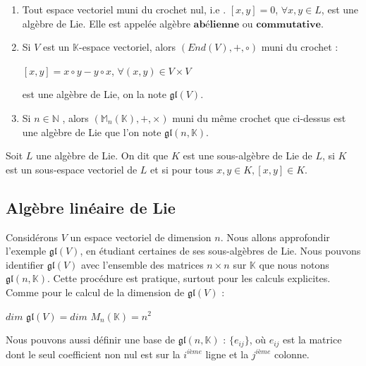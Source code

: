 \documentclass[a4paper,openany,12pt]{report}
\newcommand{\KK}{\mathbb{K}}
\newcommand{\NN}{\mathbb{N}}
\newcommand{\MM}{\mathbb{M}}
\newcommand{\gl}{\mathfrak{gl}}
\theoremstyle{break}
{\theorembodyfont{\upshape}
\newtheorem*{rmq}{Remarque :}
\newtheorem*{prv}{Preuve :}
\newtheorem*{ex}{Exemples :}
\newtheorem{exe}{Exemple : }
\newtheorem*{nota}{Notation :}}
\begin{document}
\begin{ex}
\begin{enumerate}
\item Tout espace vectoriel muni du crochet nul, i.e . $[x,y]=0$, $\forall x,y \in L $, est une algèbre de Lie. Elle est appelée algèbre $\textbf{abélienne} $ ou $\textbf{commutative}$.

\item Si $V$ est un $\KK$-espace vectoriel,  alors $(End(V),+,\circ)$ muni du crochet : 
\begin{center}
$[x,y]=x \circ y-y \circ x$, $\forall (x,y) \in V \times V$
\end{center}
est une algèbre de Lie, on la note $\gl(V)$.

\item Si $ n \in \NN $ , alors $(\MM_{n}(\KK),+,\times)$ muni du même crochet que ci-dessus est une algèbre de Lie que l'on note $\gl(n,\KK)$.
\end{enumerate}
\end{ex}

\begin{df} 
\quad Soit $L$ une algèbre de Lie. On dit que $K$ est une sous-algèbre de Lie de $L$, si $K$ est un sous-espace vectoriel de $L$ et si pour tous $x , y \in K , [x,y] \in K$.
\end{df}

\subsection{Algèbre linéaire de Lie}

\quad Considérons $V$ un espace vectoriel de dimension $n$. Nous allons approfondir l'exemple $\gl(V)$, en étudiant certaines de ses sous-algèbres de Lie. Nous pouvons identifier $\gl(V)$  avec l'ensemble des matrices $n \times n$ sur $\KK$ que nous notons $\gl(n,\KK)$. Cette procédure est pratique, surtout pour les calculs explicites. Comme pour le calcul de la dimension de $\gl(V)$ :
\begin{center}
$dim$ $\gl(V)= dim$ $M_{n}(\KK) = n^{2}$
\end{center}
\quad Nous pouvons aussi définir une base de $\gl(n,\KK)$ : $ \{ e_{ij} \}$, où $e_{ij}$ est la matrice dont le seul coefficient non nul est sur la $i^{ième}$ ligne et la $j^{ième}$ colonne.
 
\end{document}
